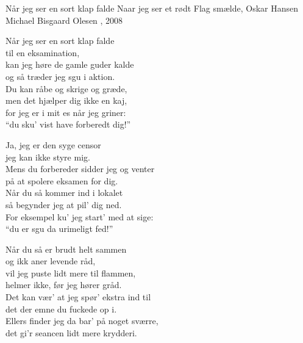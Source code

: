 \begin{song}{Når jeg ser en sort klap falde}
  {} %
  {Naar jeg ser et rødt Flag smælde, Oskar Hansen} %
  {Michael Bisgaard Olesen} %
  {\TKET{}, 2008} %
  {\NotCCLIed} %

  \begin{SBVerse}
    Når jeg ser en sort klap falde\\
    til en eksamination,\\
    kan jeg høre de gamle guder kalde\\
    og så træder jeg sgu i aktion.\\
    Du kan råbe og skrige og græde,\\
    men det hjælper dig ikke en kaj,\\
    for jeg er i mit es når jeg griner:\\
    “du sku’ vist have forberedt dig!”
  \end{SBVerse}

  \begin{SBVerse}
    Ja, jeg er den syge censor\\
    jeg kan ikke styre mig.\\
    Mens du forbereder sidder jeg og venter\\
    på at spolere eksamen for dig.\\
    Når du så kommer ind i lokalet\\
    så begynder jeg at pil’ dig ned.\\
    For eksempel ku’ jeg start’ med at sige:\\
    “du er sgu da urimeligt fed!”
  \end{SBVerse}

  \begin{SBVerse}
    Når du så er brudt helt sammen\\
    og ikk aner levende råd,\\
    vil jeg puste lidt mere til flammen,\\
    helmer ikke, før jeg hører gråd.\\
    Det kan vær’ at jeg spør’ ekstra ind til\\
    det der emne du fuckede op i.\\
    Ellers finder jeg da bar’ på noget sværre,\\
    det gi’r seancen lidt mere krydderi.
  \end{SBVerse}


\end{song}
